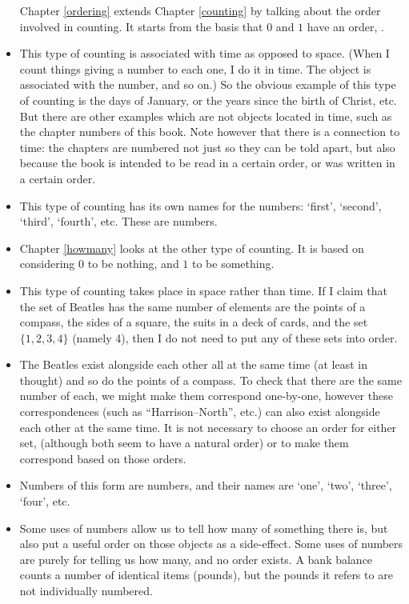 \begin{itemize}
Chapter \ref{ordering} extends Chapter \ref{counting} by talking about the order involved in counting. It starts from the basis that $0$ and $1$ have an order, .
\item
This type of counting is associated with time as opposed to space. (When I count things giving a number to each one, I do it in time. The  object is associated with the  number, and so on.) So the obvious example of this type of counting is the days of January, or the years since the birth of Christ, etc. But there are other examples which are not objects located in time, such as the chapter numbers of this book. Note however that there is a connection to time: the chapters are numbered not just so they can be told apart, but also because the book is intended to be read in a certain order, or was written in a certain order.
\item
This type of counting has its own names for the numbers: `first', `second', `third', `fourth', etc. These are  numbers.
\item
Chapter \ref{howmany} looks at the other type of counting. It is based on considering $0$ to be nothing, and $1$ to be something. 
\item
This type of counting takes place in space rather than time. If I claim that the set of Beatles has the same number of elements are the points of a compass, the sides of a square, the suits in a deck of cards, and the set $\{1,2,3,4\}$ (namely 4), then I do not need to put any of these sets into order.
\item
The Beatles exist alongside each other all at the same time (at least in thought) and so do the points of a compass. To check that there are the same number of each, we might make them correspond one-by-one, however these correspondences (such as ``Harrison--North'', etc.) can also exist alongside each other at the same time. It is not necessary to choose an order for either set, (although both seem to have a natural order) or to make them correspond based on those orders.
\item 
Numbers of this form are  numbers, and their names are `one', `two', `three', `four', etc.
\item
Some uses of numbers allow us to tell how many of something there is, but also put a useful order on those objects as a side-effect. Some uses of numbers are purely for telling us how many, and no order exists. A bank balance counts a number of identical items (pounds), but the pounds it refers to are not individually numbered. 
\end{itemize}
